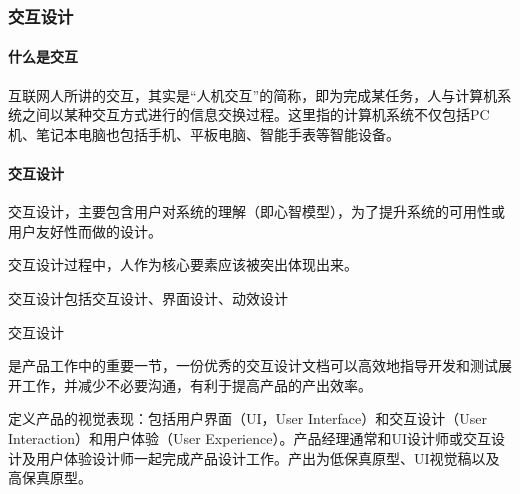 \documentclass[letterpaper,10pt,english]{sphinxmanual}
\begin{document}
\subsubsection{交互设计}
\label{\detokenize{chapter_knowledge/IXD_design:id1}}\label{\detokenize{chapter_knowledge/IXD_design::doc}}

\paragraph{什么是交互}
\label{\detokenize{chapter_knowledge/IXD_design:id2}}\label{\detokenize{chapter_knowledge/IXD_design:id3}}
互联网人所讲的交互，其实是“人机交互”的简称，即为完成某任务，人与计算机系统之间以某种交互方式进行的信息交换过程。这里指的计算机系统不仅包括PC机、笔记本电脑也包括手机、平板电脑、智能手表等智能设备。
%
\begin{footnote}[623]\sphinxAtStartFootnote
{}
%
\end{footnote}


\paragraph{交互设计}
\label{\detokenize{chapter_knowledge/IXD_design:id4}}
交互设计，主要包含用户对系统的理解（即心智模型），为了提升系统的可用性或用户友好性而做的设计。

交互设计过程中，人作为核心要素应该被突出体现出来。

交互设计包括交互设计、界面设计、动效设计%
\begin{footnote}[624]\sphinxAtStartFootnote
{}
%
\end{footnote}

交互设计%
\begin{footnote}[625]\sphinxAtStartFootnote
{}
%
\end{footnote}是产品工作中的重要一节，一份优秀的交互设计文档可以高效地指导开发和测试展开工作，并减少不必要沟通，有利于提高产品的产出效率。%
\begin{footnote}[626]\sphinxAtStartFootnote
{}
%
\end{footnote}

定义产品的视觉表现：包括用户界面（UI，User Interface）和交互设计（User
Interaction）和用户体验（User
Experience）。产品经理通常和UI设计师或交互设计及用户体验设计师一起完成产品设计工作。产出为低保真原型、UI视觉稿以及高保真原型。%
\begin{footnote}[627]\sphinxAtStartFootnote
{}
%
\end{footnote}
\end{document}
